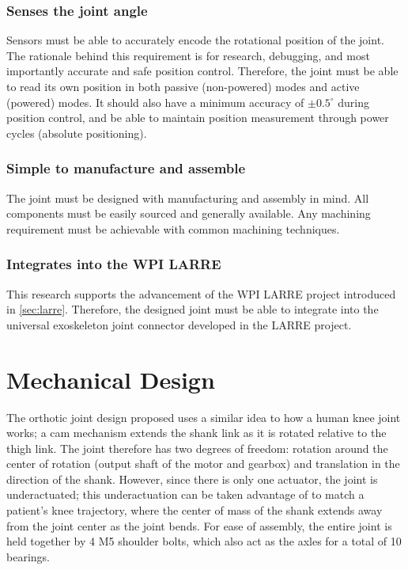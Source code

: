 \subsubsection{Senses the joint angle}
Sensors must be able to accurately encode the rotational position of the joint. The rationale behind this requirement is for research, debugging, and most importantly accurate and safe position control. Therefore, the joint must be able to read its own position in both passive (non-powered) modes and active (powered) modes. It should also have a minimum accuracy of \(\pm0.5^\circ\) during position control, and be able to maintain position measurement through power cycles (absolute positioning).

\subsubsection{Simple to manufacture and assemble}
The joint must be designed with manufacturing and assembly in mind. All components must be easily sourced and generally available. Any machining requirement must be achievable with common machining techniques.

\subsubsection{Integrates into the WPI LARRE}
This research supports the advancement of the WPI LARRE project introduced in \autoref{sec:larre}. Therefore, the designed joint must be able to integrate into the universal exoskeleton joint connector developed in the LARRE project.

\section{Mechanical Design}

The orthotic joint design proposed uses a similar idea to how a human knee joint works; a cam mechanism  extends the shank link as it is rotated relative to the thigh link. The joint therefore has two degrees of freedom: rotation around the center of rotation (output shaft of the motor and gearbox) and translation in the direction of the shank. However, since there is only one actuator, the joint is underactuated; this underactuation can be taken advantage of to match a patient's knee trajectory, where the center of mass of the shank extends away from the joint center as the joint bends. For ease of assembly, the entire joint is held together by 4 M5 shoulder bolts, which also act as the axles for a total of 10 bearings. 

